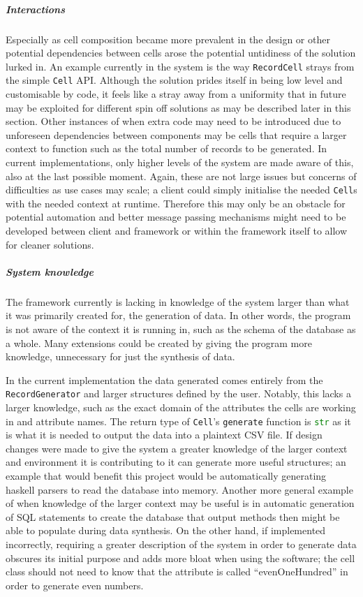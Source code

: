 \subparagraph{Interactions} Especially as cell composition became more prevalent
in the design or other potential dependencies between cells arose the potential
untidiness of the solution lurked in. An example currently in the system is the
way \lstinline{RecordCell} strays from the simple \lstinline{Cell} API. Although
the solution prides itself in being low level and customisable by code, it
feels like a stray away from a uniformity that in future may be exploited for
different spin off solutions as may be described later in this section. Other
instances of when extra code may need to be introduced due to unforeseen
dependencies between components may be cells that require a larger context to
function such as
the total number of records to be generated. In current implementations, only
higher levels of the system are made aware of this, also at the last possible
moment. Again, these are not large issues but concerns of difficulties as
use cases may scale; a client could simply initialise the needed
\lstinline{Cell}s with the needed context at runtime. Therefore this may only
be an obstacle for potential automation and better message passing mechanisms
might need to be developed between client and framework or within the framework
itself to allow for cleaner solutions.

\subparagraph{System knowledge} The framework currently is lacking in knowledge
of the system larger than what it was primarily created for, the generation of
data. In other words, the program is not aware of the context it is running in,
such as the schema of the database as a whole. Many extensions could be created
by giving the program more knowledge, unnecessary for just the synthesis of
data.

In the current implementation the data generated comes entirely from the
\lstinline{RecordGenerator} and larger structures defined by the user. Notably,
this lacks a larger knowledge, such as the exact domain of the attributes the
cells are working in and attribute names. The return type of \lstinline{Cell}'s
\lstinline{generate} function is \lstinline[language=Python]{str} as it is what
it is needed to output the data into a plaintext CSV file. If design changes
were made to give the system a greater knowledge of the larger context and
environment it is contributing to it can generate more useful structures; an
example that would benefit this project would be automatically generating
haskell parsers to read the database into memory. Another more general example of when
knowledge of the larger context may be useful is in automatic generation of SQL
statements to create the database that output methods then might be able to
populate during data synthesis. On the other hand, if implemented incorrectly,
requiring a greater description of the system in order to generate data obscures
its initial purpose and adds more bloat when using the software; the cell class
should not need to know that the attribute is called ``evenOneHundred'' in order
to generate even numbers.
